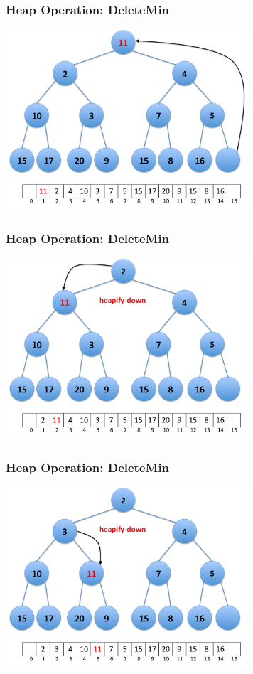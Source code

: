 \documentclass{beamer}
\begin{document}
\begin{frame}[containsverbatim]
\frametitle{Heap Operation: DeleteMin}

\begin{center}
\includegraphics[width=9cm]{heap_delete_min2.pdf}
\end{center}

\end{frame}

\begin{frame}[containsverbatim]
\frametitle{Heap Operation: DeleteMin}

\begin{center}
\includegraphics[width=9cm]{heap_delete_min3.pdf}
\end{center}

\end{frame}

\begin{frame}[containsverbatim]
\frametitle{Heap Operation: DeleteMin}

\begin{center}
\includegraphics[width=9cm]{heap_delete_min4.pdf}
\end{center}

\end{frame}
\end{document}
